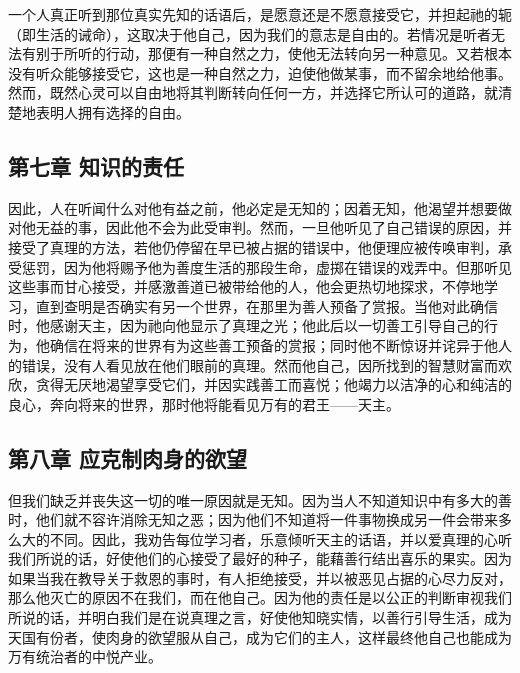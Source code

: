 一个人真正听到那位真实先知的话语后，是愿意还是不愿意接受它，并担起祂的轭（即生活的诫命），这取决于他自己，因为我们的意志是自由的。若情况是听者无法有别于所听的行动，那便有一种自然之力，使他无法转向另一种意见。又若根本没有听众能够接受它，这也是一种自然之力，迫使他做某事，而不留余地给他事。然而，既然心灵可以自由地将其判断转向任何一方，并选择它所认可的道路，就清楚地表明人拥有选择的自由。\par


\subsection{第七章 知识的责任}

因此，人在听闻什么对他有益之前，他必定是无知的；因着无知，他渴望并想要做对他无益的事，因此他不会为此受审判。然而，一旦他听见了自己错误的原因，并接受了真理的方法，若他仍停留在早已被占据的错误中，他便理应被传唤审判，承受惩罚，因为他将赐予他为善度生活的那段生命，虚掷在错误的戏弄中。但那听见这些事而甘心接受，并感激善道已被带给他的人，他会更热切地探求，不停地学习，直到查明是否确实有另一个世界，在那里为善人预备了赏报。当他对此确信时，他感谢天主，因为祂向他显示了真理之光；他此后以一切善工引导自己的行为，他确信在将来的世界有为这些善工预备的赏报；同时他不断惊讶并诧异于他人的错误，没有人看见放在他们眼前的真理。然而他自己，因所找到的智慧财富而欢欣，贪得无厌地渴望享受它们，并因实践善工而喜悦；他竭力以洁净的心和纯洁的良心，奔向将来的世界，那时他将能看见万有的君王——天主。\par


\subsection{第八章 应克制肉身的欲望}

但我们缺乏并丧失这一切的唯一原因就是无知。因为当人不知道知识中有多大的善时，他们就不容许消除无知之恶；因为他们不知道将一件事物换成另一件会带来多么大的不同。因此，我劝告每位学习者，乐意倾听天主的话语，并以爱真理的心听我们所说的话，好使他们的心接受了最好的种子，能藉善行结出喜乐的果实。因为如果当我在教导关于救恩的事时，有人拒绝接受，并以被恶见占据的心尽力反对，那么他灭亡的原因不在我们，而在他自己。因为他的责任是以公正的判断审视我们所说的话，并明白我们是在说真理之言，好使他知晓实情，以善行引导生活，成为天国有份者，使肉身的欲望服从自己，成为它们的主人，这样最终他自己也能成为万有统治者的中悦产业。\par

